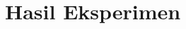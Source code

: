 \chapter{Hasil Eksperimen}
\label{lamp:B}

\def\scl{1}
\def\leg{} 
\def\std{none}
\def\ymin{}
\def\ymax{}

%
%
%
%
%
%
%
